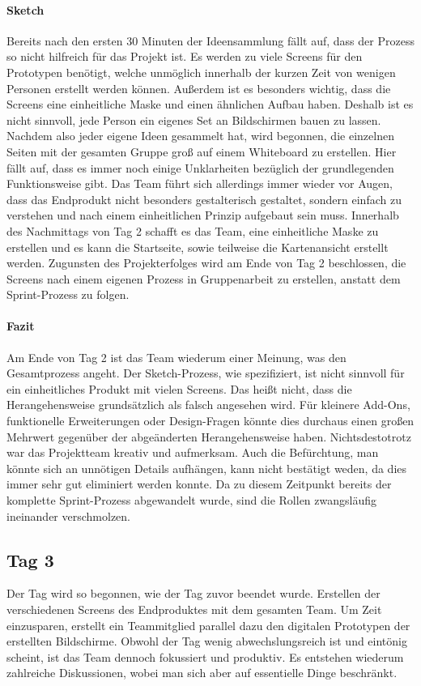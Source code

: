 \paragraph{Sketch}
\label{ref:Sprint-Umsetzung-Sketch}
Bereits nach den ersten 30 Minuten der Ideensammlung fällt auf, dass der Prozess so nicht hilfreich für das Projekt ist. Es werden zu viele Screens für den Prototypen benötigt, welche unmöglich innerhalb der kurzen Zeit von wenigen Personen erstellt werden können. Außerdem ist es besonders wichtig, dass die Screens eine einheitliche Maske und einen ähnlichen Aufbau haben. Deshalb ist es nicht sinnvoll, jede Person ein eigenes Set an Bildschirmen bauen zu lassen. Nachdem also jeder eigene Ideen gesammelt hat, wird begonnen, die einzelnen Seiten mit der gesamten Gruppe groß auf einem Whiteboard zu erstellen. Hier fällt auf, dass es immer noch einige Unklarheiten bezüglich der grundlegenden Funktionsweise gibt. Das Team führt sich allerdings immer wieder vor Augen, dass das Endprodukt nicht besonders gestalterisch gestaltet, sondern einfach zu verstehen und nach einem einheitlichen Prinzip aufgebaut sein muss. Innerhalb des Nachmittags von Tag 2 schafft es das Team, eine einheitliche Maske zu erstellen und es kann die Startseite, sowie teilweise die Kartenansicht erstellt werden.
Zugunsten des Projekterfolges wird am Ende von Tag 2 beschlossen, die Screens nach einem eigenen Prozess in Gruppenarbeit zu erstellen, anstatt dem Sprint-Prozess zu folgen.

\paragraph{Fazit}
Am Ende von Tag 2 ist das Team wiederum einer Meinung, was den Gesamtprozess angeht. Der Sketch-Prozess, wie spezifiziert, ist nicht sinnvoll für ein einheitliches Produkt mit vielen Screens. Das heißt nicht, dass die Herangehensweise grundsätzlich als falsch angesehen wird. Für kleinere Add-Ons, funktionelle Erweiterungen oder Design-Fragen könnte dies durchaus einen großen Mehrwert gegenüber der abgeänderten Herangehensweise haben. Nichtsdestotrotz war das Projektteam kreativ und aufmerksam.  Auch die Befürchtung, man könnte sich an unnötigen Details aufhängen, kann nicht bestätigt weden, da dies immer sehr gut eliminiert werden konnte. Da zu diesem Zeitpunkt bereits der komplette Sprint-Prozess abgewandelt wurde, sind die Rollen zwangsläufig ineinander verschmolzen.

\subsection*{\label{sec:Sprint-Umsetzung-Tag3}\thesubsection\quad Tag 3}Der Tag wird so begonnen, wie der Tag zuvor beendet wurde. Erstellen der verschiedenen Screens des Endproduktes mit dem gesamten Team. Um Zeit einzusparen, erstellt ein Teammitglied parallel dazu den digitalen Prototypen der erstellten Bildschirme. Obwohl der Tag wenig abwechslungsreich ist und eintönig scheint, ist das Team dennoch fokussiert und produktiv. Es entstehen wiederum zahlreiche Diskussionen, wobei man sich aber auf essentielle Dinge beschränkt.

